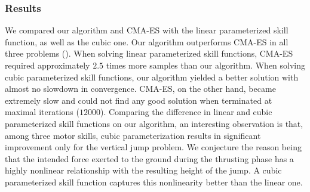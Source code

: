 
\subsubsection{Results}
We compared our algorithm and CMA-ES with the linear parameterized skill
function, as well as the cubic one. Our algorithm outperforms CMA-ES in
all three problems (). When solving linear
parameterized skill functions, CMA-ES required
approximately $2.5$ times more samples than our algorithm. When
solving cubic parameterized skill functions, our algorithm yielded a
better solution with almost no slowdown in convergence. CMA-ES, on the
other hand, became extremely slow and could not find any good solution
when terminated at maximal iterations ($12000$). Comparing the
difference in linear and cubic parameterized skill functions on our
algorithm, an interesting observation is that, among three motor
skills, cubic parameterization results in significant improvement only
for the vertical jump problem. We conjecture the reason being that the intended force exerted to the
ground during the thrusting phase has a highly nonlinear relationship with the resulting height
of the jump. A cubic parameterized skill function captures this
nonlinearity better than the linear one.


